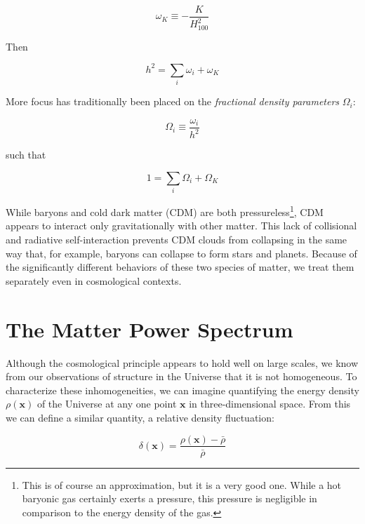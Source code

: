 \begin{equation}
\omega_{K} \equiv -\frac{K}{H_{100}^2}
\end{equation}

Then

\begin{equation}
h^2 = \sum_i \omega_i + \omega_K
\end{equation}

More focus has traditionally been placed on
the \textit{fractional density parameters} $\Omega_i$:

\begin{equation}
\Omega_i \equiv \frac{\omega_i}{h^2}
\end{equation} %

such that 

\begin{equation}
1 = \sum_i \Omega_i + \Omega_K
\end{equation}


While baryons and cold dark matter (CDM) are both pressureless\footnote{This 
is of
course an approximation, but it is a very good one. While a hot baryonic gas 
certainly exerts a pressure, this pressure is negligible in comparison to the 
energy density of the gas.}, CDM appears to interact only gravitationally
with other matter. This lack of collisional and radiative self-interaction
prevents CDM clouds from collapsing in the same way that, for example,
baryons can collapse to form stars and planets. Because of the significantly
different behaviors of these two species of matter, we treat them separately
even in cosmological contexts.

\section{The Matter Power Spectrum}
\label{sec: Pk_intro}

Although the cosmological principle appears to hold well on large scales,
we know from our observations of structure in the Universe that it is not 
homogeneous. To characterize these inhomogeneities, we can imagine quantifying 
the energy density $\rho(\bm{x})$ of the Universe at any one point $\bm{x}$ in 
three-dimensional space. From this we can define a similar quantity, a relative density fluctuation:

\begin{equation}
\delta(\bm{x}) = \frac{\rho(\bm{x}) - \bar{\rho}}{\bar{\rho}}
\end{equation}

